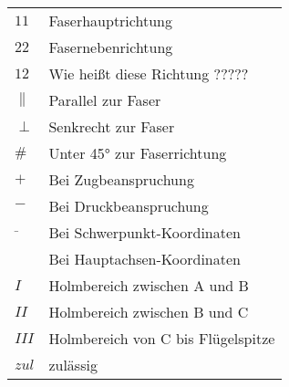 \begin{table}[h]
	\begin{tabular}{ll}
		$ 11 $&Faserhauptrichtung\\
		$ 22 $&Fasernebenrichtung\\
		$ 12 $&Wie heißt diese Richtung ?????\\
		$ \parallel $&Parallel zur Faser\\
		$ \perp $&Senkrecht zur Faser\\
		$ \# $&Unter 45° zur Faserrichtung\\
		$ + $&Bei Zugbeanspruchung\\
		$ - $&Bei Druckbeanspruchung\\
		$ \bar{ } $&Bei Schwerpunkt-Koordinaten\\
		$ \hat{ } $&Bei Hauptachsen-Koordinaten\\
		$ I $ &Holmbereich zwischen A und B\\
		$ II $ &Holmbereich zwischen B und C\\
		$ III $ &Holmbereich von C bis Flügelspitze\\
		$ zul $&zulässig
		
	\end{tabular}
\end{table}


